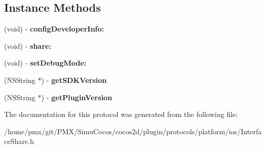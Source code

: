 \subsection*{Instance Methods}
\begin{DoxyCompactItemize}
\item 
\mbox{\label{protocolInterfaceShare_01-p_ad3491eb923e078c285e46b1e9ea8658d}} 
(void) -\/ {\bfseries config\+Developer\+Info\+:}
\item 
\mbox{\label{protocolInterfaceShare_01-p_ab9e6f5312931a30fc5b88d8db6f64017}} 
(void) -\/ {\bfseries share\+:}
\item 
\mbox{\label{protocolInterfaceShare_01-p_ad6c016e1853b4e4efe806643fe9aa2fd}} 
(void) -\/ {\bfseries set\+Debug\+Mode\+:}
\item 
\mbox{\label{protocolInterfaceShare_01-p_a4461a126a5c643af5c3bef0da8eac1e9}} 
(N\+S\+String $\ast$) -\/ {\bfseries get\+S\+D\+K\+Version}
\item 
\mbox{\label{protocolInterfaceShare_01-p_a4157cd46e16ab3be6da9d44afd4a8b04}} 
(N\+S\+String $\ast$) -\/ {\bfseries get\+Plugin\+Version}
\end{DoxyCompactItemize}


The documentation for this protocol was generated from the following file\+:\begin{DoxyCompactItemize}
\item 
/home/pmx/git/\+P\+M\+X/\+Simu\+Cocos/cocos2d/plugin/protocols/platform/ios/Interface\+Share.\+h\end{DoxyCompactItemize}
